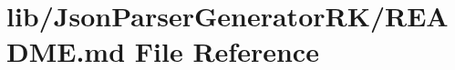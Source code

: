 \hypertarget{lib_2_json_parser_generator_r_k_2_r_e_a_d_m_e_8md}{}\section{lib/\+Json\+Parser\+Generator\+R\+K/\+R\+E\+A\+D\+ME.md File Reference}
\label{lib_2_json_parser_generator_r_k_2_r_e_a_d_m_e_8md}
